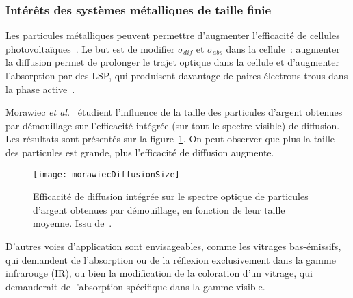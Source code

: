 		\subsubsection{Intérêts des systèmes métalliques de taille finie}
Les particules métalliques peuvent permettre d'augmenter l'efficacité de cellules photovoltaïques~\cite{morawiec2013self, tan2013improved, tan2013micro, schuster2015plasmonic}. Le but est de modifier $\sigma_{dif}$ et $\sigma_{abs}$ dans la cellule~: augmenter la diffusion permet de prolonger le trajet optique dans la cellule et d'augmenter l'absorption par des LSP, qui produisent davantage de paires électrons-trous dans la phase active~\cite{atwater2010plasmonics}.\par 
Morawiec \textit{et al.}~\cite{morawiec2013self} étudient l'influence de la taille des particules d'argent obtenues par démouillage sur l'efficacité intégrée (sur tout le spectre visible) de diffusion. Les résultats sont présentés sur la figure~\ref{morawiecDiffusionSize}. On peut observer que plus la taille des particules est grande, plus l'efficacité de diffusion augmente.\par 
\begin{figure}[!htb]
	\centering
	\texttt{[image: morawiecDiffusionSize]}
	\caption{Efficacité de diffusion intégrée sur le spectre optique de particules d'argent obtenues par démouillage, en fonction de leur taille moyenne. Issu de~\cite{morawiec2013self}.}
	\label{morawiecDiffusionSize}
\end{figure}
D'autres voies d'application sont envisageables, comme les vitrages bas-émissifs, qui demandent de l'absorption ou de la réflexion exclusivement dans la gamme infrarouge (IR), ou bien la modification de la coloration d'un vitrage, qui demanderait de l'absorption spécifique dans la gamme visible.\par 


